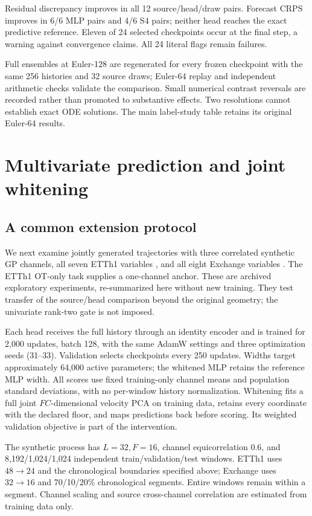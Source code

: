 \documentclass[10pt,twocolumn]{article}
\begin{document}
Residual discrepancy improves in all 12 source/head/draw pairs. Forecast CRPS improves in 6/6 MLP pairs and 4/6 S4 pairs; neither head reaches the exact predictive reference. Eleven of 24 selected checkpoints occur at the final step, a warning against convergence claims. All 24 literal flags remain failures.

Full ensembles at Euler-128 are regenerated for every frozen checkpoint with the same 256 histories and 32 source draws; Euler-64 replay and independent arithmetic checks validate the comparison. Small numerical contrast reversals are recorded rather than promoted to substantive effects. Two resolutions cannot establish exact ODE solutions. The main label-study table retains its original Euler-64 results.

\clearpage
\section{Multivariate prediction and joint whitening}
\subsection{A common extension protocol}
We next examine jointly generated trajectories with three correlated synthetic GP channels, all seven ETTh1 variables \cite{informer}, and all eight Exchange variables \cite{lstnet}. The ETTh1 OT-only task supplies a one-channel anchor. These are archived exploratory experiments, re-summarized here without new training. They test transfer of the source/head comparison beyond the original geometry; the univariate rank-two gate is not imposed.

Each head receives the full history through an identity encoder and is trained for 2,000 updates, batch 128, with the same AdamW settings and three optimization seeds (31--33). Validation selects checkpoints every 250 updates. Widths target approximately 64,000 active parameters; the whitened MLP retains the reference MLP width. All scores use fixed training-only channel means and population standard deviations, with no per-window history normalization. Whitening fits a full joint $FC$-dimensional velocity PCA on training data, retains every coordinate with the declared floor, and maps predictions back before scoring. Its weighted validation objective is part of the intervention.

The synthetic process has $L=32,F=16$, channel equicorrelation 0.6, and 8,192/1,024/1,024 independent train/validation/test windows. ETTh1 uses $48\to24$ and the chronological boundaries specified above; Exchange uses $32\to16$ and 70/10/20\% chronological segments. Entire windows remain within a segment. Channel scaling and source cross-channel correlation are estimated from training data only.
\end{document}
